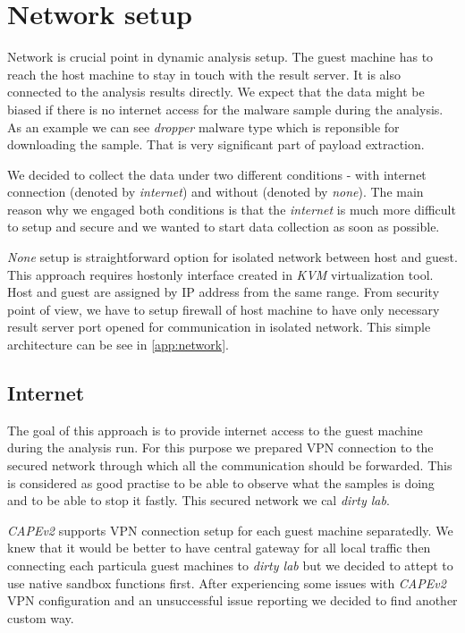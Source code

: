\section{Network setup}
Network is crucial point in dynamic analysis setup. The guest machine has to reach the host machine to stay in touch with the result server. It is also connected to the analysis results directly. We expect that the data might be biased if there is no internet access for the malware sample during the analysis. As an example we can see \emph{dropper} malware type which is reponsible for downloading the sample. That is very significant part of payload extraction.

We decided to collect the data under two different conditions - with internet connection (denoted by \emph{internet}) and without (denoted by \emph{none}). The main reason why we engaged both conditions is that the \emph{internet} is much more difficult to setup and secure and we wanted to start data collection as soon as possible.

\emph{None} setup is straightforward option for isolated network between host and guest. This approach requires hostonly interface created in \emph{KVM} virtualization tool. Host and guest are assigned by IP address from the same range. From security point of view, we have to setup firewall of host machine to have only necessary result server port opened for communication in isolated network. This simple architecture can be see in \ref{app:network}.

\subsection{Internet}
The goal of this approach is to provide internet access to the guest machine during the analysis run. For this purpose we prepared VPN connection to the secured network through which all the communication should be forwarded. This is considered as good practise to be able to observe what the samples is doing and to be able to stop it fastly. This secured network we cal \emph{dirty lab}.

\emph{CAPEv2} supports VPN connection setup for each guest machine separatedly. We knew that it would be better to have central gateway for all local traffic then connecting each particula guest machines to \emph{dirty lab} but we decided to attept to use native sandbox functions first. After experiencing some issues with \emph{CAPEv2} VPN configuration and an unsuccessful issue reporting we decided to find another custom way. 

